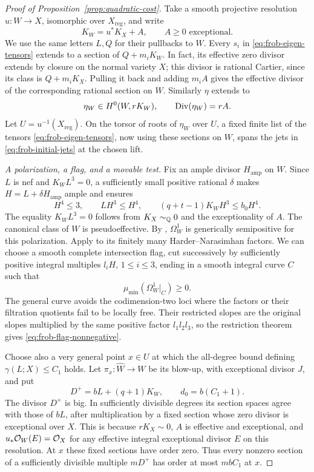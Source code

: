 \begin{proof}[Proof of Proposition~\ref{prop:quadratic-cost}]
Take a smooth projective resolution $u:W\to X$, isomorphic over
$X_{\mathrm{reg}}$, and write
\[
 K_W=u^*K_X+A,\qquad A\ge0\text{ exceptional}.
\]
We use the same letters $L,Q$ for their pullbacks to $W$.
Every $s_i$ in \eqref{eq:frob-eigen-tensors} extends to a section of
$Q+m_iK_W$.  In fact, its effective zero divisor extends by closure on
the normal variety $X$; this divisor is rational Cartier, since its
class is $Q+m_iK_X$.  Pulling it back and adding $m_iA$ gives the
effective divisor of the corresponding rational section on $W$.
Similarly $\eta$ extends to
\[
 \eta_W\in H^0(W,rK_W),\qquad \operatorname{Div}(\eta_W)=rA.
\]
Let $U=u^{-1}(X_{\mathrm{reg}})$.  On the torsor of roots of $\eta_W$
over $U$, a fixed finite list of the tensors
\eqref{eq:frob-eigen-tensors}, now using these sections on $W$, spans
the jets in \eqref{eq:frob-initial-jets} at the chosen lift.

\emph{A polarization, a flag, and a movable test.}
Fix an ample divisor $H_{\mathrm{amp}}$ on $W$.  Since $L$ is nef and
$K_WL^3=0$, a sufficiently small positive rational $\delta$ makes
$H=L+\delta H_{\mathrm{amp}}$ ample and ensures
\begin{equation}\label{eq:frob-polarization}
 H^4\le3,
 \qquad LH^3\le H^4,
 \qquad (q+t-1)K_WH^3\le b_0H^4.
\end{equation}
The equality $K_WL^3=0$ follows from $K_X\sim_{\mathbb Q}0$ and the
exceptionality of $A$.  The canonical class of $W$ is pseudoeffective.
By \cite[Theorem~2.1]{CampanaPaun2015}, $\Omega_W^1$ is generically
semipositive for this polarization.  Apply
\cite[Theorem~6.1]{MehtaRamanathan1982} to its finitely many
Harder--Narasimhan factors.  We can choose a smooth complete
intersection flag, cut successively by sufficiently positive integral
multiples $l_iH$, $1\le i\le3$, ending in a smooth integral curve $C$
such that
\begin{equation}\label{eq:frob-flag-nonnegative}
 \mu_{\min}(\Omega_W^1|_C)\ge0.
\end{equation}
The general curve avoids the codimension-two loci where the factors
or their filtration quotients fail to be locally free.  Their
restricted slopes are the original slopes multiplied by the same
positive factor $l_1l_2l_3$, so the restriction theorem gives
\eqref{eq:frob-flag-nonnegative}.

Choose also a very general point $x\in U$ at which the all-degree bound
defining $\gamma(L;X)\le C_1$ holds.  Let
$\pi_x:\widehat W\to W$ be its blow-up, with exceptional divisor $J$,
and put
\begin{equation}\label{eq:frob-test-divisor}
 D^+=bL+(q+1)K_W,\qquad d_0=b(C_1+1).
\end{equation}
The divisor $D^+$ is big.  In sufficiently divisible degrees its
section spaces agree with those of $bL$, after multiplication by a
fixed section whose zero divisor is exceptional over $X$.  This is
because $rK_X\sim0$, $A$ is effective and exceptional, and
$u_*\mathcal O_W(E)=\mathcal O_X$ for any effective integral exceptional divisor
$E$ on this resolution.  At $x$ these fixed sections have order zero.
Thus every nonzero section of a sufficiently divisible multiple
$mD^+$ has order at most $mbC_1$ at $x$.


\end{proof}
